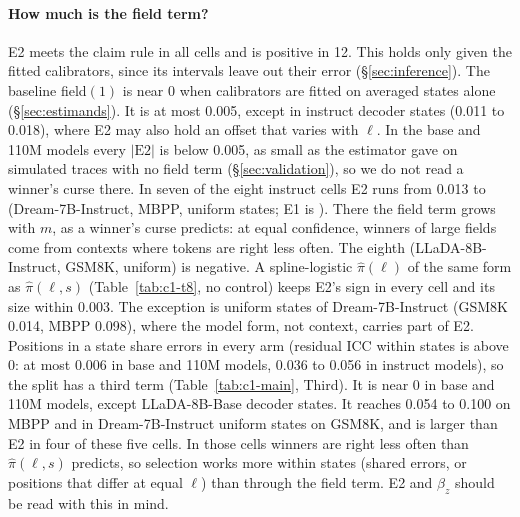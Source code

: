 \paragraph{How much is the field term?}
E2 meets the claim rule in all  cells and is positive in 12. This holds
only given the fitted calibrators, since its intervals leave out their error (\S\ref{sec:inference}).
The baseline field$(1)$ is near 0 when calibrators are fitted on averaged states alone
(\S\ref{sec:estimands}). It is at most 0.005, except in instruct decoder states (0.011 to 0.018),
where E2 may also hold an offset that varies with $\ell$. In the base and 110M models every
$|\mathrm{E2}|$ is below 0.005, as small as the estimator gave on simulated traces with no field
term (\S\ref{sec:validation}), so we do not read a winner's curse there. In seven of the eight
instruct cells E2 runs from 0.013 to 
(Dream-7B-Instruct, MBPP, uniform states; E1 is ). There the
field term grows with $m$, as a winner's curse predicts: at equal confidence, winners of large
fields come from contexts where tokens are right less often. The eighth (LLaDA-8B-Instruct, GSM8K,
uniform) is negative.
A spline-logistic $\hat\pi(\ell)$ of the same form as $\hat\pi(\ell,s)$ (Table~\ref{tab:c1-t8}, no
control) keeps E2's sign in every cell and its size within 0.003. The exception is uniform states
of Dream-7B-Instruct (GSM8K 0.014, MBPP 0.098), where the model form, not context, carries part of E2.
Positions in a state share errors in every arm (residual ICC within states is above 0: at most 0.006
in base and 110M models, 0.036 to 0.056 in instruct models), so the split has a third term
(Table~\ref{tab:c1-main}, Third). It is near 0 in base and 110M models, except LLaDA-8B-Base decoder
states. It reaches 0.054 to 0.100 on MBPP and in Dream-7B-Instruct uniform states on GSM8K, and is
larger than E2 in four of these five cells. In those cells winners are right less often than
$\hat\pi(\ell,s)$ predicts, so selection works more within states (shared errors, or positions that
differ at equal $\ell$) than through the field term. E2 and $\beta_z$ should be read with this in mind.


